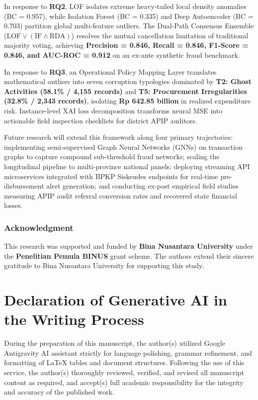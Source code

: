 \documentclass[runningheads]{llncs}
\begin{document}
In response to \textbf{RQ2}, LOF isolates extreme heavy-tailed local density anomalies (BC = 0.957), while Isolation Forest (BC = 0.335) and Deep Autoencoder (BC = 0.703) partition global multi-feature outliers. The Dual-Path Consensus Ensemble ($\text{LOF} \lor (\text{IF} \land \text{RDA})$) resolves the mutual cancellation limitation of traditional majority voting, achieving \textbf{Precision = 0.846, Recall = 0.846, F1-Score = 0.846, and AUC-ROC = 0.912} on an ex-ante synthetic fraud benchmark.

In response to \textbf{RQ3}, an Operational Policy Mapping Layer translates mathematical outliers into seven corruption typologies dominated by \textbf{T2: Ghost Activities (58.1\% / 4,155 records)} and \textbf{T5: Procurement Irregularities (32.8\% / 2,343 records)}, isolating \textbf{Rp 642.85 billion} in realized expenditure risk. Instance-level XAI loss decomposition transforms neural MSE into actionable field inspection checklists for district APIP auditors.

Future research will extend this framework along four primary trajectories: implementing semi-supervised Graph Neural Networks (GNNs) on transaction graphs to capture compound sub-threshold fraud networks; scaling the longitudinal pipeline to multi-province national panels; deploying streaming API microservices integrated with BPKP Siskeudes endpoints for real-time pre-disbursement alert generation; and conducting ex-post empirical field studies measuring APIP audit referral conversion rates and recovered state financial losses.

\subsubsection*{Acknowledgment}
This research was supported and funded by \textbf{Bina Nusantara University} under the \textbf{Penelitian Pemula BINUS} grant scheme. The authors extend their sincere gratitude to Bina Nusantara University for supporting this study.

\section*{Declaration of Generative AI in the Writing Process}
During the preparation of this manuscript, the author(s) utilized Google Antigravity AI assistant strictly for language polishing, grammar refinement, and formatting of LaTeX tables and document structures. Following the use of this service, the author(s) thoroughly reviewed, verified, and revised all manuscript content as required, and accept(s) full academic responsibility for the integrity and accuracy of the published work.



\end{document}
